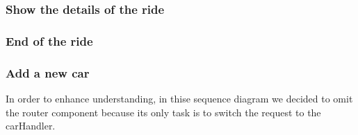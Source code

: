 \pagebreak
\subsubsection{Show the details of the ride}

\pagebreak
\subsubsection{End of the ride}

\pagebreak
\subsubsection{Add a new car}
In order to enhance understanding, in thise sequence diagram we decided to omit the router component because its only task is to switch the request to the carHandler.
